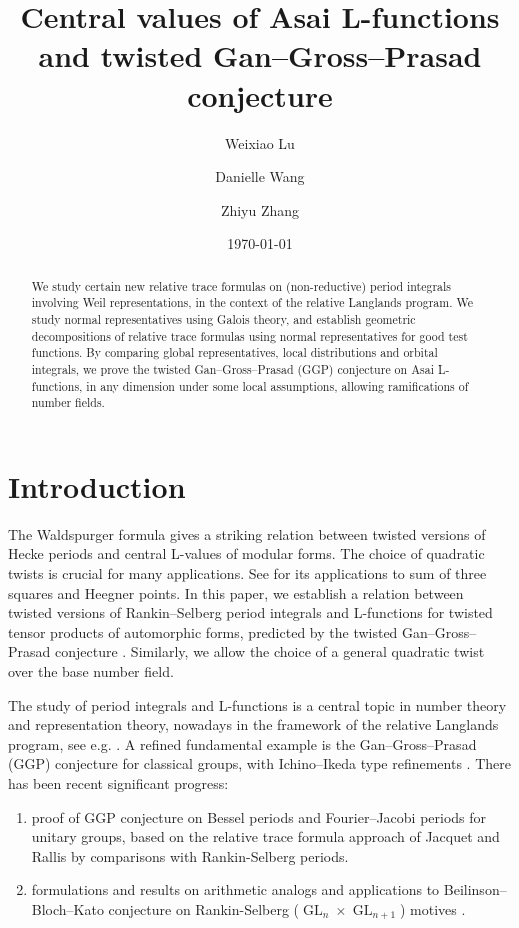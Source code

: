 \documentclass[11pt, reqno]{amsart}
\title[Twisted GGP conjecture]{Central values of Asai L-functions and twisted Gan--Gross--Prasad conjecture}
\author[Weixiao Lu]{Weixiao Lu}
\author[Danielle Wang]{Danielle Wang}
\author[Zhiyu Zhang]{Zhiyu Zhang}
\date{\today}
\numberwithin{equation}{subsection}
\theoremstyle{plain}
\theoremstyle{definition}
\DeclareMathOperator{\GL}{GL}
\begin{document}
\maketitle

\begin{abstract}
We study certain new relative trace formulas on (non-reductive) period integrals involving Weil representations, in the context of the relative Langlands program. We study normal representatives using Galois theory, and establish geometric decompositions of relative trace formulas using normal representatives for good test functions. By comparing global representatives, local distributions and orbital integrals, we prove the twisted Gan--Gross--Prasad (GGP) conjecture on Asai L-functions, in any dimension under some local assumptions, allowing ramifications of number fields.
\end{abstract}

\setcounter{tocdepth}{1}
\tableofcontents

\section{Introduction}

The Waldspurger formula \cite{waldspurger1985valeurs} gives a striking relation between twisted versions of Hecke periods and central L-values of modular forms. The choice of quadratic twists is crucial for many applications. See \cite{duke1988hyperbolic, duke1990representation} for its applications to sum of three squares and Heegner points. In this paper, we establish a relation between twisted versions of Rankin--Selberg period integrals and L-functions for twisted tensor products of automorphic forms, predicted by the twisted Gan--Gross--Prasad conjecture \cite{TwistedGGP}. Similarly, we allow the choice of a general quadratic twist over the base number field.

The study of period integrals and L-functions is a central topic in number theory and representation theory, nowadays in the framework of the relative Langlands program, see e.g. \cite{BZSV}. A refined fundamental example is the Gan--Gross--Prasad (GGP) conjecture \cite{GGP-conjectures} for classical groups, with Ichino--Ikeda type refinements \cite{GGP-conjecture-refinements}. There has been recent significant progress:
\begin{enumerate}
    \item proof of GGP conjecture on Bessel periods \cite{GGP-stable,GGP-endoscopic} and Fourier--Jacobi periods \cite{GGP-FourierJacobi} for unitary groups, based on the relative trace formula approach of Jacquet and Rallis by comparisons with Rankin-Selberg periods.
    \item formulations and results on arithmetic analogs and applications to Beilinson--Bloch--Kato conjecture on Rankin-Selberg ($\GL_n \times \GL_{n+1}$) motives  \cite{LTXZZ, liu2024iwasawa, disegni2024gan}. 
\end{enumerate}
\end{document}
